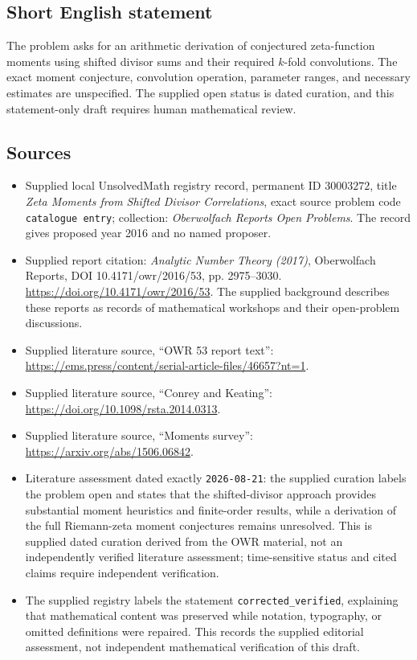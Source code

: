 \documentclass[11pt]{article}
\begin{document}
\subsection{Short English statement}
The problem asks for an arithmetic derivation of conjectured zeta-function moments using shifted divisor sums and their required \(k\)-fold convolutions. The exact moment conjecture, convolution operation, parameter ranges, and necessary estimates are unspecified. The supplied open status is dated curation, and this statement-only draft requires human mathematical review.
\subsection{Sources}
\begin{itemize}
\item Supplied local UnsolvedMath registry record, permanent ID \(30003272\), title \emph{Zeta Moments from Shifted Divisor Correlations}, exact source problem code \texttt{catalogue entry}; collection: \emph{Oberwolfach Reports Open Problems}. The record gives proposed year 2016 and no named proposer.
\item Supplied report citation: \emph{Analytic Number Theory (2017)}, Oberwolfach Reports, DOI 10.4171/owr/2016/53, pp. 2975--3030. \url{https://doi.org/10.4171/owr/2016/53}. The supplied background describes these reports as records of mathematical workshops and their open-problem discussions.
\item Supplied literature source, ``OWR 53 report text'': \url{https://ems.press/content/serial-article-files/46657?nt=1}.
\item Supplied literature source, ``Conrey and Keating'': \url{https://doi.org/10.1098/rsta.2014.0313}.
\item Supplied literature source, ``Moments survey'': \url{https://arxiv.org/abs/1506.06842}.
\item Literature assessment dated exactly \texttt{2026-08-21}: the supplied curation labels the problem open and states that the shifted-divisor approach provides substantial moment heuristics and finite-order results, while a derivation of the full Riemann-zeta moment conjectures remains unresolved. This is supplied dated curation derived from the OWR material, not an independently verified literature assessment; time-sensitive status and cited claims require independent verification.
\item The supplied registry labels the statement \texttt{corrected\_verified}, explaining that mathematical content was preserved while notation, typography, or omitted definitions were repaired. This records the supplied editorial assessment, not independent mathematical verification of this draft.
\end{itemize}
\end{document}
